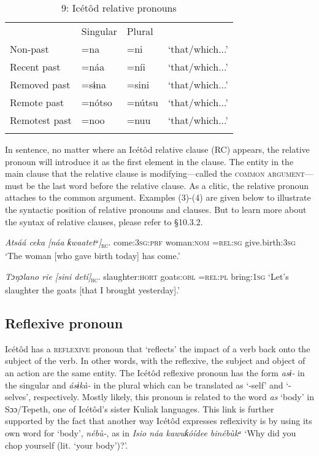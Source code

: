 \begin{table}
\caption{9: Icétôd relative pronouns}
\label{tab:5}


\begin{tabularx}{\textwidth}{XXXX} & Singular & Plural & \\
\lsptoprule
Non-past & =na & =ni & ‘that/which...’\\
Recent past & =náa & =níi & ‘that/which...’\\
Removed past & =sɨna & =sini & ‘that/which...’\\
Remote past & =nótso & =nútsu & ‘that/which...’\\
Remotest past & =noo & =nuu & ‘that/which...’\\
\lspbottomrule
\end{tabularx}
\end{table}
In sentence, no matter where an Icétôd relative clause (RC) appears, the relative pronoun will introduce it as the first element in the clause. The entity in the main clause that the relative clause is modifying—called the \textsc{common argument}—must be the last word before the relative clause. As a clitic, the relative pronoun attaches to the common argument. Examples (3)-(4) are given below to illustrate the syntactic position of relative pronouns and clauses. But to learn more about the syntax of relative clauses, please refer to §10.3.2.




\textit{Atsáá     ceka     [náa       ƙwaatetᵃ]}\textsc{\textsubscript{rc}}.
come:\textsc{3sg:prf}   woman:\textsc{nom} =\textsc{rel:sg} give.birth:\textsc{3sg}
‘The woman [who gave birth today] has come.’




\textit{Tɔŋɔlano     rie     [sini     detí]}\textsc{\textsubscript{rc}}.
slaughter:\textsc{hort}   goats:\textsc{obl}      =\textsc{rel:pl}   bring:\textsc{1sg}
‘Let’s slaughter the goats [that I brought yesterday].’






\subsection{Reflexive pronoun}


Icétôd has a \textsc{reflexive} pronoun that ‘reflects’ the impact of a verb back onto the subject of the verb. In other words, with the reflexive, the subject and object of an action are the same entity. The Icétôd reflexive pronoun has the form \textit{asɨ-} in the singular and \textit{ásɨkà-} in the plural which can be translated as ‘-self’ and ‘-selves’, respectively. Mostly likely, this pronoun is related to the word \textit{as} ‘body’ in Sɔɔ/Tepeth, one of Icétôd’s sister Kuliak languages. This link is further supported by the fact that another way Icétôd expresses reflexivity is by using its own word for ‘body’, \textit{nébù-}, as in \textit{Isio náa kawuƙóídee binébùkᵃ} ‘Why did you chop yourself (lit. ‘your body’)?’.


